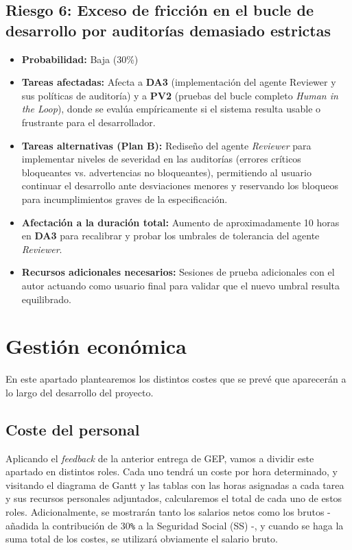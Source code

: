 \documentclass[11pt, letterpaper]{article}
\begin{document}
\subsection{Riesgo 6: Exceso de fricción en el bucle de desarrollo por auditorías demasiado estrictas}
\begin{itemize}
    \item \textbf{Probabilidad:} Baja (30\%)
    \item \textbf{Tareas afectadas:} Afecta a \textbf{DA3} (implementación del agente Reviewer y sus políticas de auditoría) y a \textbf{PV2} (pruebas del bucle completo \textit{Human in the Loop}), donde se evalúa empíricamente si el sistema resulta usable o frustrante para el desarrollador.
    \item \textbf{Tareas alternativas (Plan B):} Rediseño del agente \textit{Reviewer} para implementar niveles de severidad en las auditorías (errores críticos bloqueantes vs. advertencias no bloqueantes), permitiendo al usuario continuar el desarrollo ante desviaciones menores y reservando los bloqueos para incumplimientos graves de la especificación.
    \item \textbf{Afectación a la duración total:} Aumento de aproximadamente 10 horas en \textbf{DA3} para recalibrar y probar los umbrales de tolerancia del agente \textit{Reviewer}.
    \item \textbf{Recursos adicionales necesarios:} Sesiones de prueba adicionales con el autor actuando como usuario final para validar que el nuevo umbral resulta equilibrado.
\end{itemize}

\newpage

\section{Gestión económica}
En este apartado plantearemos los distintos costes que se prevé que aparecerán a lo largo del desarrollo del proyecto.

\subsection{Coste del personal}
Aplicando el \textit{feedback} de la anterior entrega de GEP, vamos a dividir este apartado en distintos roles. Cada uno tendrá un coste por hora determinado, y visitando el diagrama de Gantt y las tablas con las horas asignadas a cada tarea y sus recursos personales adjuntados, calcularemos el total de cada uno de estos roles. Adicionalmente, se mostrarán tanto los salarios netos como los brutos - añadida la contribución de 30\verb|%| a la Seguridad Social (SS) -, y cuando se haga la suma total de los costes, se utilizará obviamente el salario bruto.
\end{document}
